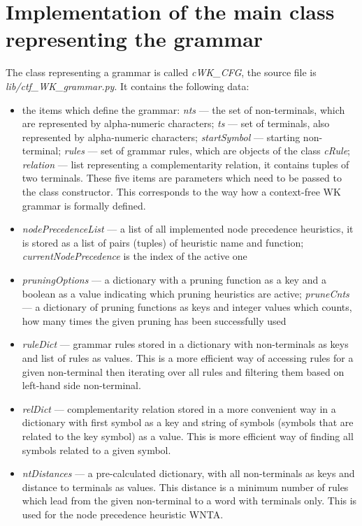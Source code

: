 \section{Implementation of the main class representing the grammar}
The class representing a grammar is called \textit{cWK\_CFG}, the source file is \textit{lib/ctf\_WK\_grammar.py}. It contains the following data:
\begin{itemize}
  \item{the items which define the grammar: \textit{nts} --- the set of non-terminals, which are represented by alpha-numeric characters; \textit{ts} --- set of terminals, also represented by alpha-numeric characters; \textit{startSymbol} --- starting non-terminal; \textit{rules} --- set of grammar rules, which are objects of the class \textit{cRule}; \textit{relation} --- list representing a complementarity relation, it contains tuples of two terminals. These five items are parameters which need to be passed to the class constructor. This corresponds to the way how a context-free WK grammar is formally defined.}

  \item{\textit{nodePrecedenceList} --- a list of all implemented node precedence heuristics, it is stored as a list of pairs (tuples) of heuristic name and function; \textit{currentNodePrecedence} is the index of the active one}

  \item{\textit{pruningOptions} --- a dictionary with a pruning function as a key and a boolean as a value indicating which pruning heuristics are active; \textit{pruneCnts} --- a dictionary of pruning functions as keys and integer values which counts, how many times the given pruning has been successfully used}

  \item{\textit{ruleDict} --- grammar rules stored in a dictionary with non-terminals as keys and list of rules as values. This is a more efficient way of accessing rules for a given non-terminal then iterating over all rules and filtering them based on left-hand side non-terminal.}

  \item{\textit{relDict} --- complementarity relation stored in a more convenient way in a dictionary with first symbol as a key and string of symbols (symbols that are related to the key symbol) as a value. This is more efficient way of finding all symbols related to a given symbol.}

  \item{\textit{ntDistances} --- a pre-calculated dictionary, with all non-terminals as keys and distance to terminals as values. This distance is a minimum number of rules which lead from the given non-terminal to a word with terminals only. This is used for the node precedence heuristic WNTA.}


\end{itemize}

